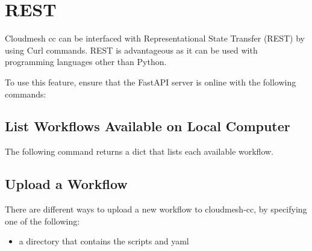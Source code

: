 \section{REST}\label{rest}

Cloudmesh cc can be interfaced with Representational State Transfer
(REST) by using Curl commands. REST is advantageous as it can be used
with programming languages other than Python.

To use this feature, ensure that the FastAPI server is online with the
following commands:

\begin{Shaded}
\begin{Highlighting}[]
\end{Highlighting}
\end{Shaded}

\subsection{List Workflows Available on Local
Computer}\label{list-workflows-available-on-local-computer}

The following command returns a dict that lists each available workflow.

\begin{Shaded}
\begin{Highlighting}[]
   \DataTypeTok{\textbackslash{}}
     \DataTypeTok{\textbackslash{}}
     
\end{Highlighting}
\end{Shaded}

\subsection{Upload a Workflow}\label{upload-a-workflow}

There are different ways to upload a new workflow to cloudmesh-cc, by
specifying one of the following:

\begin{itemize}
\tightlist
\item
  a directory that contains the scripts and yaml
\end{itemize}

